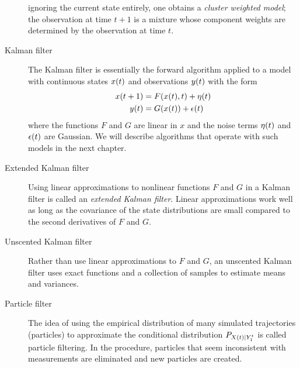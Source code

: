 \begin{description}
  ignoring the current state entirely, one obtains a \emph{ cluster
    weighted model}\cite{Gershenfeld99}; the observation at time $t+1$
  is a mixture whose component weights are determined by the
  observation at time $t$.
\item[Kalman filter] The Kalman filter is essentially the forward
  algorithm applied to a model with continuous states ${x}{(t)}$ and
  observations ${y}{(t)}$ with the form
  \begin{align*}
    {x}{(t+1)} &= F({x}{(t)},t) + {\eta}{(t)}\\
    {y}{(t)} &= G({x}{(t)}) + {\epsilon}{(t)}
  \end{align*}
  where the functions $F$ and $G$ are linear in $x$ and the noise
  terms ${\eta}{(t)}$ and ${\epsilon}{(t)}$ are Gaussian.  We will
  describe algorithms that operate with such models in the next
  chapter.
\item[Extended Kalman filter] Using linear approximations to nonlinear
  functions $F$ and $G$ in a Kalman filter is called an \emph{extended
  Kalman filter}.  Linear approximations work well as long as the
  covariance of the state distributions are small compared to the
  second derivatives of $F$ and $G$.
\item[Unscented Kalman filter] Rather than use linear approximations
  to $F$ and $G$, an unscented Kalman filter\cite{Julier97} uses exact
  functions and a collection of samples to estimate means and
  variances.
\item[Particle filter] The idea of using the empirical distribution of
  many simulated trajectories (particles) to approximate the
  conditional distribution $P_{{X}{(t)}|Y_{1}^{t}}$ is called
  particle filtering\cite{Gordon93,Kitagawa96}.  In the procedure,
  particles that seem inconsistent with measurements are eliminated
  and new particles are created. 
\end{description}

